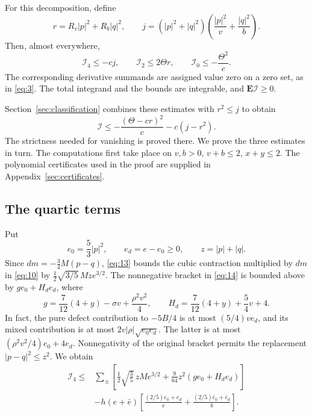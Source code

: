 \begin{samepage}
\begin{proposition}
\label{prop:coupling-estimates}
For this decomposition, define
\[
 r=R_v|p|^2+R_b|q|^2,\qquad
 j=(|p|^2+|q|^2)
       \left(\frac{|p|^2}{v}+\frac{|q|^2}{b}\right).
\]
Then, almost everywhere,
\[
 \mathcal I_4\le-cj,\qquad
 \mathcal I_2\le2\Theta r,\qquad
 \mathcal I_0\le-\frac{\Theta^2}{c}.
\]
The corresponding derivative summands are assigned value zero on a
zero set, as in \eqref{eq:3}. The total integrand and the bounds are
integrable, and $\mathbf E\mathcal I\ge0$.
\end{proposition}
\end{samepage}

Section~\ref{sec:classification} combines these estimates with $r^2\le j$ to obtain
\[
 \mathcal I\le-\frac{(\Theta-cr)^2}{c}-c(j-r^2).
\]
The strictness needed for vanishing is proved there.
We prove the three estimates in turn. The computations first take place
on $v,b>0$, $v+b\le2$, $x+y\le2$. The polynomial certificates used in
the proof are supplied in Appendix~\ref{sec:certificates}.

\subsection{The quartic terms}

Put
\[
 e_0=\frac53|p|^2,\qquad e_d=e-e_0\ge0,\qquad z=|p|+|q|.
\]
Since $dm=-\frac34M(p-q)$, \eqref{eq:13} bounds the cubic contraction
multiplied by $dm$ in \eqref{eq:10} by
$\frac12\sqrt{3/5}\,Mz e^{3/2}$. The nonnegative bracket in
\eqref{eq:14} is bounded above by $g e_0+H_d e_d$, where
\[
 g=\frac7{12}(4+y)-\sigma v+\frac{\rho^2v^2}{4},\qquad
 H_d=\frac7{12}(4+y)+\frac54v+4.
\]
In fact, the pure defect contribution to $-5B/4$ is at most
$(5/4)v e_d$, and its mixed contribution is at most
$2v|\rho|\sqrt{e_0e_d}$. The latter is at most
$(\rho^2v^2/4)e_0+4e_d$. Nonnegativity of the original bracket permits
the replacement $|p-q|^2\le z^2$. We obtain
\begin{equation}
\begin{aligned}
 \mathcal I_4\le{}&
 \sum_\pm\left[
       \frac12\sqrt{\frac35}\,zMe^{3/2}
       +\frac9{64}z^2(g e_0+H_de_d)\right]\\
 &-h(e+\bar e)
       \left[\frac{(2/5)e_0+e_d}{v}
             +\frac{(2/5)\bar e_0+\bar e_d}{b}\right].
\end{aligned}
\tag{19}\label{eq:19}
\end{equation}

